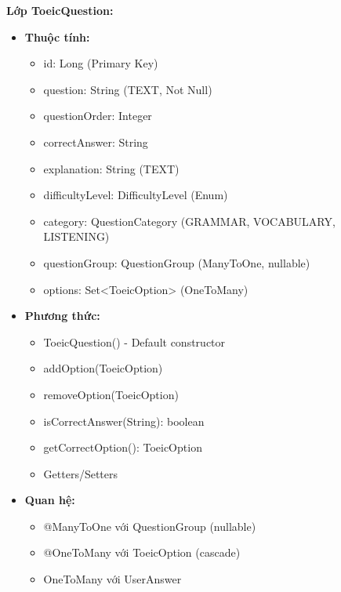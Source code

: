 \documentclass[../DoAn.tex]{subfiles}
\begin{document}
\textbf{Lớp ToeicQuestion:}
\begin{itemize}
    \item \textbf{Thuộc tính:}
    \begin{itemize}
        \item id: Long (Primary Key)
        \item question: String (TEXT, Not Null)
        \item questionOrder: Integer
        \item correctAnswer: String
        \item explanation: String (TEXT)
        \item difficultyLevel: DifficultyLevel (Enum)
        \item category: QuestionCategory (GRAMMAR, VOCABULARY, LISTENING)
        \item questionGroup: QuestionGroup (ManyToOne, nullable)
        \item options: Set<ToeicOption> (OneToMany)
    \end{itemize}
    \item \textbf{Phương thức:}
    \begin{itemize}
        \item ToeicQuestion() - Default constructor
        \item addOption(ToeicOption)
        \item removeOption(ToeicOption)
        \item isCorrectAnswer(String): boolean
        \item getCorrectOption(): ToeicOption
        \item Getters/Setters
    \end{itemize}
    \item \textbf{Quan hệ:}
    \begin{itemize}
        \item @ManyToOne với QuestionGroup (nullable)
        \item @OneToMany với ToeicOption (cascade)
        \item OneToMany với UserAnswer
    \end{itemize}
\end{itemize}
\end{document}
